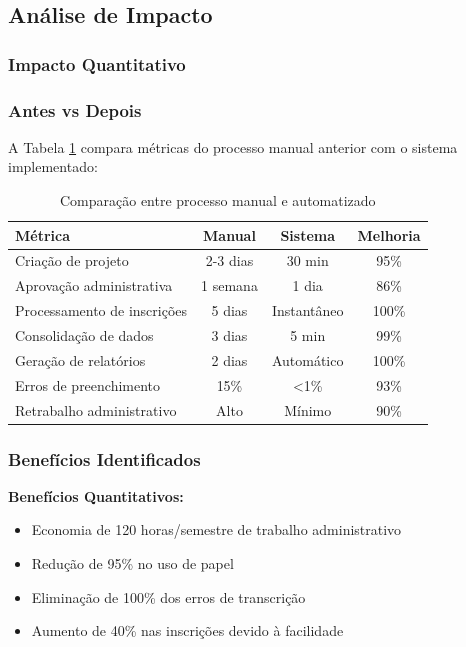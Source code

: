 \documentclass[portuguese]{sbc2025}%
\begin{document}
\subsection{Análise de Impacto}

\subsubsection{Impacto Quantitativo}

\subsubsection{Antes vs Depois}

A Tabela \ref{tab:comparacao} compara métricas do processo manual anterior com o sistema implementado:

\begin{table}[h!]
  \centering
  \caption{Comparação entre processo manual e automatizado}
  \label{tab:comparacao}
  \begin{tabular}{|l|c|c|c|}
    \hline
    \textbf{Métrica} & \textbf{Manual} & \textbf{Sistema} & \textbf{Melhoria} \\
    \hline
    Criação de projeto & 2-3 dias & 30 min & 95\% \\
    Aprovação administrativa & 1 semana & 1 dia & 86\% \\
    Processamento de inscrições & 5 dias & Instantâneo & 100\% \\
    Consolidação de dados & 3 dias & 5 min & 99\% \\
    Geração de relatórios & 2 dias & Automático & 100\% \\
    Erros de preenchimento & 15\% & <1\% & 93\% \\
    Retrabalho administrativo & Alto & Mínimo & 90\% \\
    \hline
  \end{tabular}
\end{table}

\subsubsection{Benefícios Identificados}

\textbf{Benefícios Quantitativos:}
\begin{itemize}
  \item Economia de 120 horas/semestre de trabalho administrativo
  \item Redução de 95\% no uso de papel
  \item Eliminação de 100\% dos erros de transcrição
  \item Aumento de 40\% nas inscrições devido à facilidade
\end{itemize}
\end{document}
